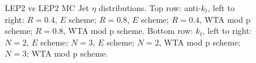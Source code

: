 \begin{figure}[H]
\hfill
{}\hfill
\caption{LEP2 vs LEP2 MC Jet $\eta$ distributions. Top row: anti-$k_t$, left to right: $R=0.4$, $E$ scheme; $R=0.8$, $E$ scheme; $R=0.4$, WTA mod p scheme; $R=0.8$, WTA mod p scheme. Bottom row: $k_t$, left to right: $N=2$, $E$ scheme; $N=3$, $E$ scheme; $N=2$, WTA mod p scheme; $N=3$; WTA mod p scheme.}  
\end{figure}

